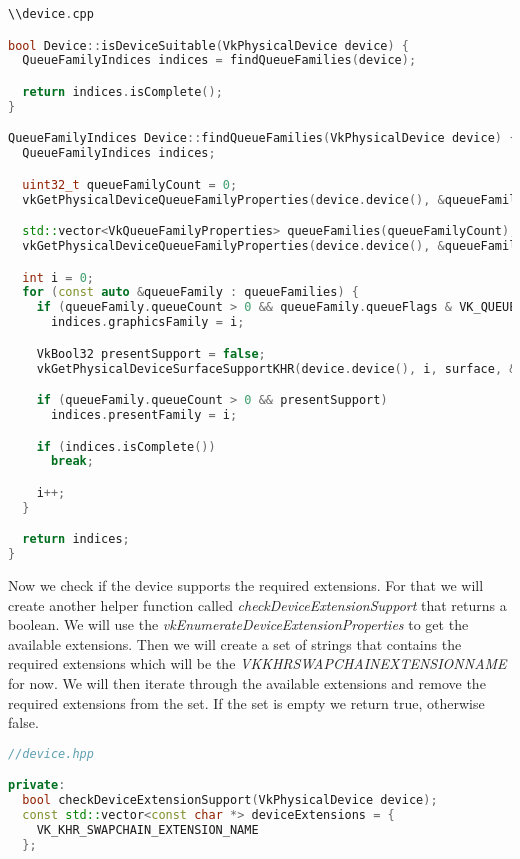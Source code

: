\documentclass[12pt]{report} \usepackage{preamble}
\begin{document}
\begin{lstlisting}[language=C++]
\\device.cpp

bool Device::isDeviceSuitable(VkPhysicalDevice device) {
  QueueFamilyIndices indices = findQueueFamilies(device);

  return indices.isComplete();
}

QueueFamilyIndices Device::findQueueFamilies(VkPhysicalDevice device) {
  QueueFamilyIndices indices;

  uint32_t queueFamilyCount = 0;
  vkGetPhysicalDeviceQueueFamilyProperties(device.device(), &queueFamilyCount, nullptr);

  std::vector<VkQueueFamilyProperties> queueFamilies(queueFamilyCount);
  vkGetPhysicalDeviceQueueFamilyProperties(device.device(), &queueFamilyCount, queueFamilies.data());

  int i = 0;
  for (const auto &queueFamily : queueFamilies) {
    if (queueFamily.queueCount > 0 && queueFamily.queueFlags & VK_QUEUE_GRAPHICS_BIT)
      indices.graphicsFamily = i;

    VkBool32 presentSupport = false;
    vkGetPhysicalDeviceSurfaceSupportKHR(device.device(), i, surface, &presentSupport);

    if (queueFamily.queueCount > 0 && presentSupport)
      indices.presentFamily = i;

    if (indices.isComplete())
      break;

    i++;
  }

  return indices;
}
\end{lstlisting}

Now we check if the device supports the required extensions. For that we will create another helper function
called \textit{checkDeviceExtensionSupport} that returns a boolean. We will use the \textit{vkEnumerateDeviceExtensionProperties}
to get the available extensions. Then we will create a set of strings that contains the required extensions which will be the
\textit{VK\textunderscore KHR\textunderscore SWAPCHAIN\textunderscore EXTENSION\textunderscore NAME} for now. We will then iterate through
the available extensions and remove the required extensions from the set. If the set is empty we return true, otherwise false.

\begin{lstlisting}[language=C++]
//device.hpp

private:
  bool checkDeviceExtensionSupport(VkPhysicalDevice device);
  const std::vector<const char *> deviceExtensions = {
    VK_KHR_SWAPCHAIN_EXTENSION_NAME
  };
\end{lstlisting}
\end{document}
